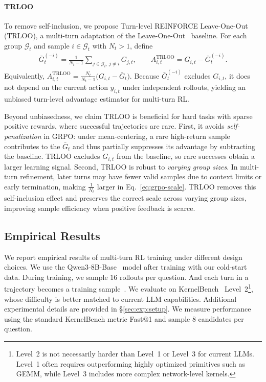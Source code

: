 \paragraph{TRLOO}
To remove self-inclusion, we propose Turn-level REINFORCE Leave-One-Out (TRLOO), a multi-turn adaptation of the Leave-One-Out~\citep{kool2019buy,ahmadian2024basicsrevisitingreinforcestyle} baseline. For each group $\mathcal{G}_{t}$ and sample $i\in\mathcal{G}_{t}$ with $N_{t}>1$, define
\begin{align}
\bar G^{(-i)}_{t}
=\frac{1}{N_{t}-1}\!\sum_{j\in\mathcal{G}_{t},\,j\neq i}\! G_{j,t}, \qquad
A^{\text{TRLOO}}_{i,t}
=G_{i,t}-\bar G^{(-i)}_{t}.
\label{eq:trloo-adv}
\end{align}
Equivalently, $A^{\text{TRLOO}}_{i,t}=\frac{N_{t}}{N_{t}-1}\big(G_{i,t}-\bar G_{t}\big)$.
Because $\bar G^{(-i)}_{t}$ excludes $G_{i,t}$, it does not depend on the current action $y_{i,t}$ under independent rollouts, yielding an unbiased turn-level advantage estimator for multi-turn RL.

Beyond unbiasedness, we claim TRLOO is beneficial for hard tasks with sparse positive rewards, where successful trajectories are rare.
First, it avoids \emph{self-penalization} in GRPO: under mean-centering, a rare high-return sample contributes to the $\bar G_{t}$ and thus partially suppresses its advantage by subtracting the baseline.
TRLOO excludes $G_{i,t}$ from the baseline, so rare successes obtain a larger learning signal.
Second, TRLOO is robust to \emph{varying group sizes}. In multi-turn refinement, later turns may have fewer valid samples due to context limits or early termination, making $\frac{1}{N_{t}}$ larger in Eq.~\eqref{eq:grpo-scale}. TRLOO removes this self-inclusion effect and preserves the correct scale across varying group sizes, improving sample efficiency when positive feedback is scarce.

\subsection{Empirical Results}
We report empirical results of multi-turn RL training under different design choices. We use the Qwen3-8B-Base~\citep{qwen3technicalreport} model after training with our cold-start data. During training, we sample $16$ rollouts per question. And each turn in a trajectory becomes a training sample~\citep{baronio2025kevinmultiturnrlgenerating}. We evaluate on KernelBench~\citep{ouyang2025kernelbench} Level~2\footnote{Level~2 is not necessarily harder than Level~1 or Level~3 for current LLMs. Level~1 often requires outperforming highly optimized primitives such as GEMM, while Level~3 includes more complex network-level kernels.}, whose difficulty is better matched to current LLM capabilities. Additional experimental details are provided in \S\ref{sec:exp:setup}. We measure performance using the standard KernelBench metric Fast@1 and sample 8 candidates per question.

